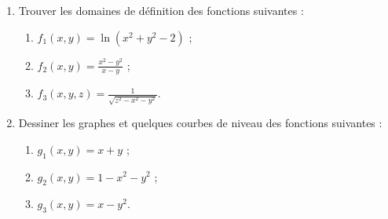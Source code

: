 \begin{exercice}\label{exodevoir1-0004}
  \begin{enumerate}
  \item Trouver les domaines de définition des fonctions suivantes : 

    \begin{enumerate}
    \item   $\displaystyle f_1(x,y)= \ln(x^2+y^2-2)$ ; 
 
    \item   $\displaystyle f_2(x,y)=\frac{x^2-y^2}{x-y}$ ;

    \item   $\displaystyle f_3(x,y,z)= \frac{1}{\sqrt{z^2-x^2-y^2}}$.

    \end{enumerate}
  
  \item Dessiner les graphes et quelques courbes de niveau des fonctions suivantes : 
    \begin{enumerate}
    \item   $\displaystyle g_1(x,y)= x+y$ ; 
 
    \item   $\displaystyle g_2(x,y)= 1-x^2-y^2$ ;

    \item   $\displaystyle g_3(x,y)= x-y^2$.
    \end{enumerate}
  \end{enumerate}

\end{exercice}
